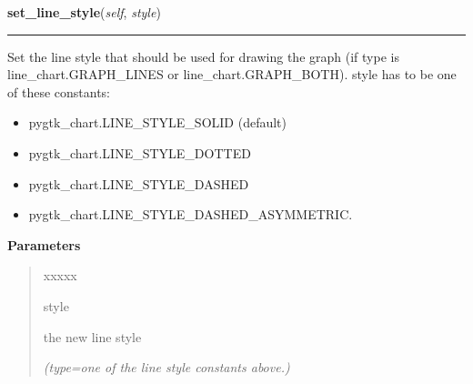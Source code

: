     \label{pygtk_chart:line_chart:Graph:set_line_style}

    \vspace{0.5ex}

\hspace{.8\funcindent}\begin{boxedminipage}{\funcwidth}

    \raggedright \textbf{set\_line\_style}(\textit{self}, \textit{style})

    \vspace{-1.5ex}

    \rule{\textwidth}{0.5\fboxrule}
\setlength{\parskip}{2ex}
    Set the line style that should be used for drawing the graph (if type 
    is line\_chart.GRAPH\_LINES or line\_chart.GRAPH\_BOTH). style has to 
    be one of these constants:

    \begin{itemize}
    \setlength{\parskip}{0.6ex}
      \item pygtk\_chart.LINE\_STYLE\_SOLID (default)

      \item pygtk\_chart.LINE\_STYLE\_DOTTED

      \item pygtk\_chart.LINE\_STYLE\_DASHED

      \item pygtk\_chart.LINE\_STYLE\_DASHED\_ASYMMETRIC.

    \end{itemize}

\setlength{\parskip}{1ex}
      \textbf{Parameters}
      \vspace{-1ex}

      \begin{quote}
        \begin{Ventry}{xxxxx}

          \item[style]

          the new line style

            {\it (type=one of the line style constants above.)}

        \end{Ventry}

      \end{quote}

    \end{boxedminipage}

